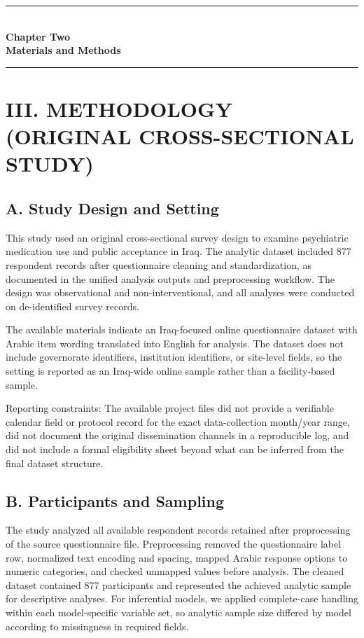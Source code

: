 \documentclass[12pt,a4paper]{article}
\begin{document}
\newpage
\thispagestyle{plain}
\begin{center}\vspace*{0.30\textheight}
{\Large\bfseries\rule{4cm}{0.4pt}}\\[10pt]
{\Huge\bfseries Chapter Two}\\[8pt]
{\Large\bfseries Materials and Methods}\\[10pt]
{\Large\bfseries\rule{4cm}{0.4pt}}
\end{center}
\newpage
\section*{III. METHODOLOGY (ORIGINAL CROSS-SECTIONAL STUDY)}
\subsection*{A. Study Design and Setting}
This study used an original cross-sectional survey design to examine psychiatric medication use and public acceptance in Iraq. The analytic dataset included 877 respondent records after questionnaire cleaning and standardization, as documented in the unified analysis outputs and preprocessing workflow. The design was observational and non-interventional, and all analyses were conducted on de-identified survey records.

The available materials indicate an Iraq-focused online questionnaire dataset with Arabic item wording translated into English for analysis. The dataset does not include governorate identifiers, institution identifiers, or site-level fields, so the setting is reported as an Iraq-wide online sample rather than a facility-based sample.

Reporting constraints: The available project files did not provide a verifiable calendar field or protocol record for the exact data-collection month/year range, did not document the original dissemination channels in a reproducible log, and did not include a formal eligibility sheet beyond what can be inferred from the final dataset structure.

\subsection*{B. Participants and Sampling}
The study analyzed all available respondent records retained after preprocessing of the source questionnaire file. Preprocessing removed the questionnaire label row, normalized text encoding and spacing, mapped Arabic response options to numeric categories, and checked unmapped values before analysis. The cleaned dataset contained 877 participants and represented the achieved analytic sample for descriptive analyses. For inferential models, we applied complete-case handling within each model-specific variable set, so analytic sample size differed by model according to missingness in required fields.
\end{document}
